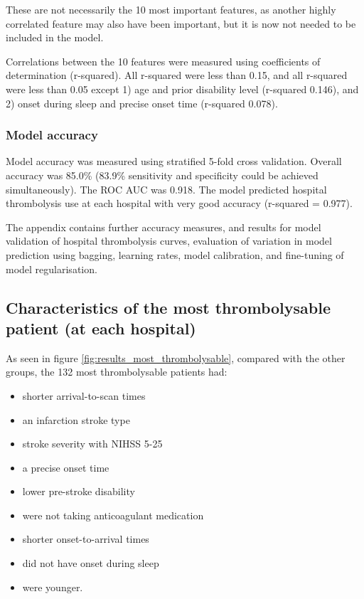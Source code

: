 These are not necessarily the 10 most important features, as another highly correlated feature may also have been important, but it is now not needed to be included in the model.

Correlations between the 10 features were measured using coefficients of determination (r-squared). All r-squared were less than 0.15, and all r-squared were less than 0.05 except 1) age and prior disability level (r-squared 0.146), and 2) onset during sleep and precise onset time (r-squared 0.078).


\subsubsection{Model accuracy}

Model accuracy was measured using stratified 5-fold cross validation. Overall accuracy was 85.0\% (83.9\% sensitivity and specificity could be achieved simultaneously). The ROC AUC was 0.918. The model predicted hospital thrombolysis use at each hospital with very good accuracy (r-squared = 0.977).

The appendix contains further accuracy measures, and results for model validation of hospital thrombolysis curves, evaluation of variation in model prediction using bagging, learning rates, model calibration, and fine-tuning of model regularisation.


\subsection{Characteristics of the most thrombolysable patient (at each hospital)}

As seen in figure \ref{fig:results_most_thrombolysable}, compared with the other groups, the 132 most thrombolysable patients had:
\begin{itemize}
    \item shorter arrival-to-scan times
    \item an infarction stroke type
    \item stroke severity with NIHSS 5-25
    \item a precise onset time
    \item lower pre-stroke disability
    \item were not taking anticoagulant medication
    \item shorter onset-to-arrival times
    \item did not have onset during sleep
    \item were younger.
\end{itemize}

